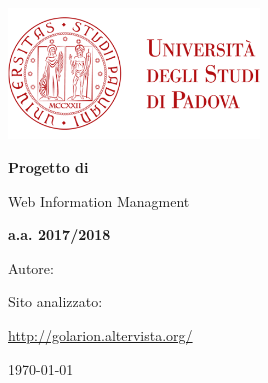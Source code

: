 \begin{titlepage} 
	\centering
	\includegraphics[width=0.50\textwidth]{img/logo_unipd_color.png}\par\vspace{1cm} %
	
	{\LARGE\bfseries Progetto di \par Web Information Managment \par}
	\vspace{1cm}
	
	{\Large\bfseries a.a. 2017/2018 \par}
	
	\vspace{1cm} 

	Autore: \par
	{\bfseries \authorName \par} 
	
	\vspace{1cm}


    Sito analizzato: \par
	\url{http://golarion.altervista.org/}

    \vfill
	
	{\large \today\par}
	
\end{titlepage}